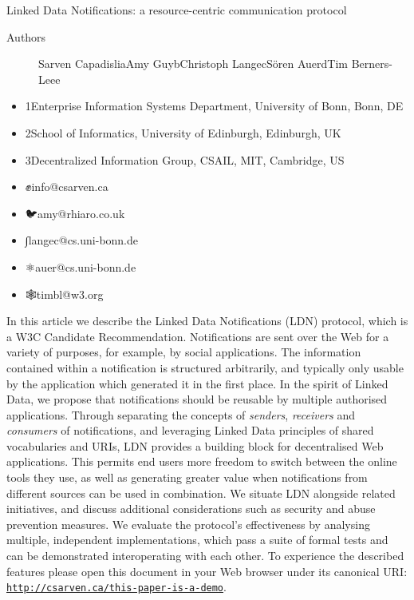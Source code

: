 \documentclass[a4paper]{llncs}
\begin{document}
                Linked Data Notifications: a resource-centric communication protocol


                    \begin{description}
  \item[Authors] \empty Sarven Capadisli\empty a\empty Amy Guy\empty b\empty Christoph Lange\empty c\empty Sören Auer\empty d\empty Tim Berners-Lee\empty e
    \end{description}


                    \begin{itemize}
  \item 1Enterprise Information Systems Department, \empty University of Bonn, Bonn, DE\item 2School of Informatics, \empty University of Edinburgh, Edinburgh, UK\item 3Decentralized Information Group, CSAIL, \empty MIT, Cambridge, US
    \end{itemize}


                    \begin{itemize}
  \item ✊\empty info@csarven.ca\item 🐦\empty amy@rhiaro.co.uk\item ∫\empty langec@cs.uni-bonn.de\item ⚛\empty auer@cs.uni-bonn.de\item 🕸\empty timbl@w3.org
    \end{itemize}








\par In this article we describe the Linked Data Notifications (LDN) protocol, which is a \empty W3C Candidate Recommendation. Notifications are sent over the Web for a variety of purposes, for example, by social applications. The information contained within a notification is structured arbitrarily, and typically only usable by the application which generated it in the first place. In the spirit of Linked Data, we propose that notifications should be reusable by multiple authorised applications. Through separating the concepts of {\em senders}, {\em receivers} and {\em consumers} of notifications, and leveraging Linked Data principles of shared vocabularies and URIs, LDN provides a building block for decentralised Web applications. This permits end users more freedom to switch between the online tools they use, as well as generating greater value when notifications from different sources can be used in combination. We situate LDN alongside related initiatives, and discuss additional considerations such as security and abuse prevention measures. We evaluate the protocol’s effectiveness by analysing multiple, independent implementations, which pass a suite of formal tests and can be demonstrated interoperating with each other. To experience the described features please open this document in your Web browser under its canonical URI: {\tt \href{http://csarven.ca/this-paper-is-a-demo}{http://csarven.ca/this-paper-is-a-demo}}.
\end{document}
